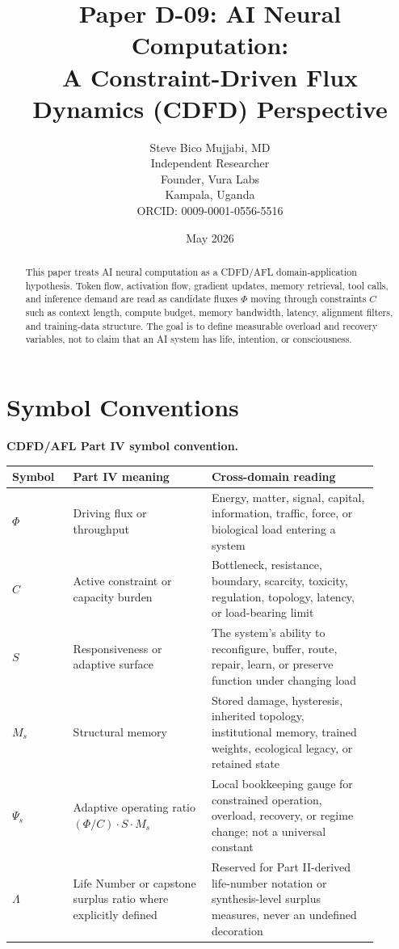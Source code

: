 \documentclass[12pt,a4paper]{article}
\title{\textbf{Paper D-09: AI Neural Computation:\\ A Constraint-Driven Flux Dynamics (CDFD) Perspective}}
\author{Steve Bico Mujjabi, MD\\
\small Independent Researcher\\
\small Founder, Vura Labs\\
\small Kampala, Uganda\\
\small ORCID: 0009-0001-0556-5516}
\date{May 2026}
\begin{document}
\maketitle

\begin{abstract}
This paper treats AI neural computation as a CDFD/AFL domain-application
hypothesis. Token flow, activation flow, gradient updates, memory retrieval,
tool calls, and inference demand are read as candidate fluxes $\Phi$ moving
through constraints $C$ such as context length, compute budget, memory bandwidth,
latency, alignment filters, and training-data structure. The goal is to define
measurable overload and recovery variables, not to claim that an AI system has
life, intention, or consciousness.
\end{abstract}

\section*{Symbol Conventions}

\noindent\textbf{CDFD/AFL Part IV symbol convention.}
\begin{center}
{\small
\begin{tabular}{p{0.15\linewidth}p{0.34\linewidth}p{0.41\linewidth}}
\hline
Symbol & Part IV meaning & Cross-domain reading \\
\hline
$\Phi$ & Driving flux or throughput & Energy, matter, signal, capital, information, traffic, force, or biological load entering a system \\
$C$ & Active constraint or capacity burden & Bottleneck, resistance, boundary, scarcity, toxicity, regulation, topology, latency, or load-bearing limit \\
$S$ & Responsiveness or adaptive surface & The system's ability to reconfigure, buffer, route, repair, learn, or preserve function under changing load \\
$M_s$ & Structural memory & Stored damage, hysteresis, inherited topology, institutional memory, trained weights, ecological legacy, or retained state \\
$\Psi_s$ & Adaptive operating ratio $(\Phi/C)\cdot S\cdot M_s$ & Local bookkeeping gauge for constrained operation, overload, recovery, or regime change; not a universal constant \\
$\Lambda$ & Life Number or capstone surplus ratio where explicitly defined & Reserved for Part II-derived life-number notation or synthesis-level surplus measures, never an undefined decoration \\
\hline
\end{tabular}
}
\end{center}
\end{document}
